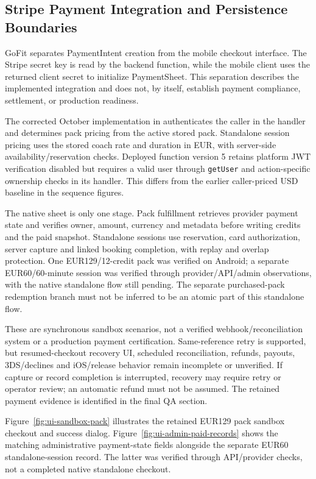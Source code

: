 \documentclass[12pt,a4paper,openany]{report}
\begin{document}
\subsection{Stripe Payment Integration and Persistence Boundaries}
\label{sec:current-payment-boundaries}

GoFit separates PaymentIntent creation from the mobile checkout interface. The Stripe secret key is read by the backend function, while the mobile client uses the returned client secret to initialize PaymentSheet. This separation describes the implemented integration and does not, by itself, establish payment compliance, settlement, or production readiness.


The corrected October implementation in  authenticates the caller in the handler and determines pack pricing from the active stored pack. Standalone session pricing uses the stored coach rate and duration in EUR, with server-side availability/reservation checks. Deployed function version 5 retains platform JWT verification disabled but requires a valid user through \texttt{getUser} and action-specific ownership checks in its handler. This differs from the earlier caller-priced USD baseline in the sequence figures.


The native sheet is only one stage. Pack fulfillment retrieves provider payment state and verifies owner, amount, currency and metadata before writing credits and the paid snapshot. Standalone sessions use reservation, card authorization, server capture and linked booking completion, with replay and overlap protection. One EUR129/12-credit pack was verified on Android; a separate EUR60/60-minute session was verified through provider/API/admin observations, with the native standalone flow still pending. The separate purchased-pack redemption branch must not be inferred to be an atomic part of this standalone flow.


These are synchronous sandbox scenarios, not a verified webhook/reconciliation system or a production payment certification. Same-reference retry is supported, but resumed-checkout recovery UI, scheduled reconciliation, refunds, payouts, 3DS/declines and iOS/release behavior remain incomplete or unverified. If capture or record completion is interrupted, recovery may require retry or operator review; an automatic refund must not be assumed. The retained payment evidence is identified in the final QA section.

Figure~\ref{fig:ui-sandbox-pack} illustrates the retained EUR129 pack sandbox checkout and success dialog. Figure~\ref{fig:ui-admin-paid-records} shows the matching administrative payment-state fields alongside the separate EUR60 standalone-session record. The latter was verified through API/provider checks, not a completed native standalone checkout.
\end{document}
